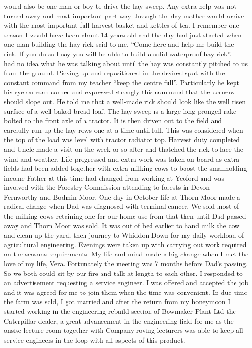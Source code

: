 would also be one man or boy to drive the hay sweep. Any extra help was not
turned away and most important part way through the day mother would arrive
with the most important full harvest basket and kettles of tea. I remember one
season I would have been about 14 years old and the day had just started when
one man building the hay rick said to me, ``Come here and help me build the
rick. If you do as I say you will be able to build a solid waterproof hay
rick''. I had no idea what he was talking about until the hay was constantly
pitched to us from the ground. Picking up and repositioned in the desired spot
with the constant command from my teacher ``keep the centre full''.
Particularly he kept his eye on each corner and expressed strongly this command
that the corners should slope out. He told me that a well-made rick should
look like the well risen surface of a well baked bread loaf.  The hay sweep is
a large long pronged rake bolted to the front axle of a tractor. It is then
driven out to the field and carefully run up the hay rows one at a time until
full. This was considered when the top of the load was level with tractor
radiator top. Harvest duty completed and Uncle made a visit on the week or so
after and thatched the rick to face the wind and weather. Life progressed and
extra work was taken on board as extra fields had been added together with
extra milking cows to boost the smallholding income  Father at this time had
changed from working at Yeoford and was involved with the Forestry Commission
attending to forests in Devon --- Fernworthy and Bodmin Moor. One day in October
life at Thorn Moor made a radical change when Dad was diagnosed with terminal
cancer. We sold most of the milking cows retaining one for our home use from
that then until Dad passed away and Thorn Moor was sold. It was out of bed
earlier to hand milk the cow and clean up the yard, then journey to Whiddon
Down for my daily workload of agricultural engineering. Evenings were taken up
with carrying out work required on the seasons requirements. My life and mind
made a big change when I met the love of my life, Vera. Fortunately the
meeting was 7 months before Dad's passing. So we both could sit by our fire
and talk at length to each other. I responded to an advertisement requesting a
service engineer. I was offered and accepted the job and it was agreed for me
to join them when the time was convenient. In due time the farm was sold, I
got married and after the return from my honeymoon I started working in the
engineering rebuild section of Bowmaker Plant Ltd the Caterpillar dealer, a
great advancement in the engineering field for me as the onsite lecture room
together with Company roving lecturers was able to keep all service engineers
in the loop with all aspects of this product.
